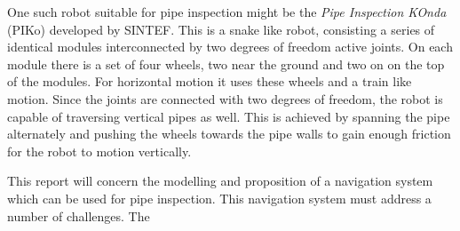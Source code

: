 One such robot suitable for pipe inspection might be the \emph{Pipe Inspection KOnda}
(PIKo) developed by SINTEF. This is a snake like robot, consisting a series of identical
modules interconnected by two degrees of freedom active joints. On each module there is a
set of four wheels, two near the ground and two on on the top of the modules. For
horizontal motion it uses these wheels and a train like motion. Since the joints are
connected with two degrees of freedom, the robot is capable of traversing vertical pipes
as well. This is achieved by spanning the pipe alternately and pushing the wheels towards
the pipe walls to gain enough friction for the robot to motion vertically. \cite{piko}

This report will concern the modelling and proposition of a navigation system which can be
used for pipe inspection. This navigation system must address a number of challenges. The


